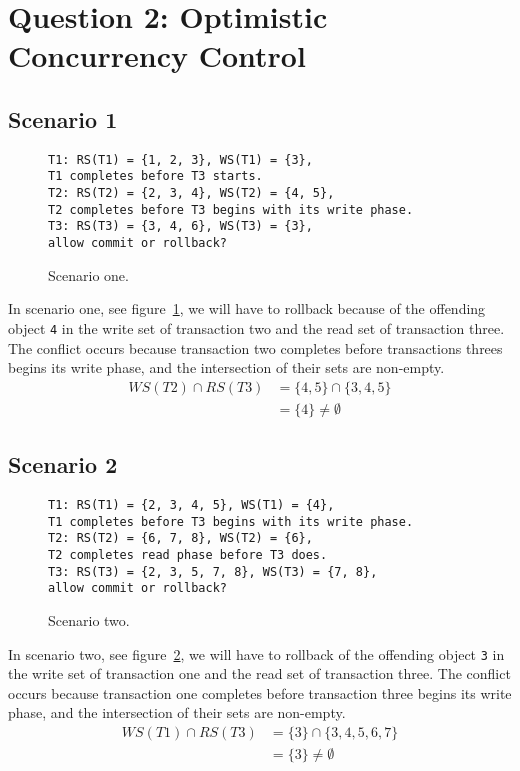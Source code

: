 \documentclass[12pt]{article}
\begin{document}
\section*{Question 2: Optimistic Concurrency Control}
\subsection*{Scenario 1}
\begin{figure}[h!]
\texttt{T1: RS(T1) = \{1, 2, 3\}, WS(T1) = \{3\},\\
T1 completes before T3 starts.\\
T2: RS(T2) = \{2, 3, 4\}, WS(T2) = \{4, 5\},\\
T2 completes before T3 begins with its write phase.\\
T3: RS(T3) = \{3, 4, 6\}, WS(T3) = \{3\},\\
allow commit or rollback?}
\caption{Scenario one.}
\label{sc1}
\end{figure}
In scenario one, see figure~\ref{sc1}, we will have to rollback because of the offending object \texttt{4} in the write set of transaction two and the read set of transaction three. The conflict occurs because transaction two completes before transactions threes begins its write phase, and the intersection of their sets are non-empty.
\begin{align}
WS(T2) \cap RS(T3) &= \{4, 5\} \cap \{3, 4, 5\}\\
&= \{4\} \neq \emptyset
\end{align}
\subsection*{Scenario 2}
\begin{figure}[h!]
\texttt{T1: RS(T1) = \{2, 3, 4, 5\}, WS(T1) = \{4\},\\
T1 completes before T3 begins with its write phase.\\
T2: RS(T2) = \{6, 7, 8\}, WS(T2) = \{6\},\\
T2 completes read phase before T3 does.\\
T3: RS(T3) = \{2, 3, 5, 7, 8\}, WS(T3) = \{7, 8\},\\
allow commit or rollback?}
\caption{Scenario two.}
\label{sc2}
\end{figure}
In scenario two, see figure~\ref{sc2}, we will have to rollback of the offending object \texttt{3} in the write set of transaction one and the read set of transaction three. The conflict occurs because transaction one completes before transaction three begins its write phase, and the intersection of their sets are non-empty.
\begin{align}
WS(T1) \cap RS(T3) &= \{3\} \cap \{3, 4, 5, 6, 7\}\\
&= \{3\} \neq \emptyset
\end{align}
\end{document}
